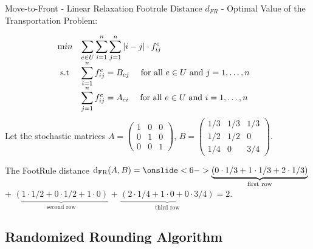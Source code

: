 \documentclass{beamer}
\begin{document}
\begin{frame}{Move-to-Front - Linear Relaxation}
     Footrule Distance $d_{FR}$ - Optimal Value of the Transportation Problem:
    
        \begin{equation*}
            \begin{array}{ll@{}ll}
                \text min & \displaystyle \sum_{e \in U} \sum_{i = 1}^{n} \sum_{j=1}^n |i - j| \cdot f_{ij}^e &\\
                \text{ s.t } & \displaystyle \sum_{i=1}^{n} f_{ij}^e = B_{ej}~~~~\text{for all }e \in U \text{ and }j=1,\ldots ,n&&\\
                & \displaystyle \sum_{j=1}^{n} f_{ij}^e = A_{ei}~~~~\text{for all }e \in U \text{ and }i=1,\ldots, n&&\\
            \end{array}
        \end{equation*}
    Let the stochastic matrices $A = 
                                \begin{pmatrix}
                                1 & 0 & 0 \\
                                0 & 1 & 0 \\
                                0 & 0 & 1
                                \end{pmatrix}$, $B = 
                                \begin{pmatrix}
                                1/3 & 1/3 & 1/3 \\
                                1/2 & 1/2 & 0 \\
                                1/4 & 0 & 3/4
                                \end{pmatrix}$. 
    
     The FootRule distance $\mathrm{d}_{\mathrm{FR}}(A,B) = \onslide<6-> \underbrace{(0\cdot 1/3 + 1\cdot 1/3 + 2\cdot 1/3)}_{\text{first row}}$  + $\underbrace{(1\cdot 1/2 + 0\cdot 1/2 + 1\cdot 0)}_{\text{second row}}$  + $\underbrace{(2\cdot 1/4 + 1\cdot 0 + 0\cdot 3/4)}_{\text{third row}} = 2$.
\end{frame}

\subsection{Randomized Rounding Algorithm}
\end{document}

